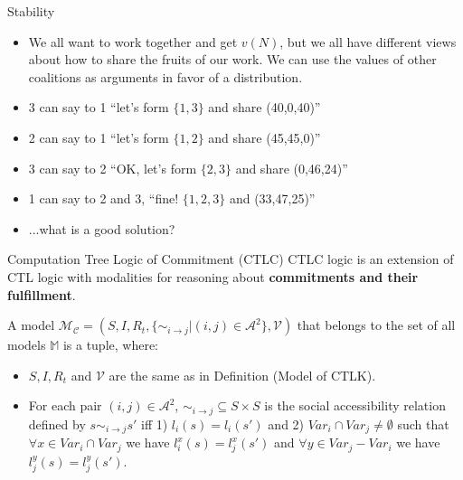 \documentclass{beamer}
\begin{document}
\begin{frame}{Stability}
    \begin{itemize}
        \item We all want to work together and get $v(N)$, but we all have different views about how to share the fruits of our work. We can use the values of other coalitions as arguments in favor of a distribution.
        \item 3 can say to 1 ``let's form $\{1,3\}$ and share (40,0,40)''
        \item 2 can say to 1 ``let's form $\{1,2\}$ and share (45,45,0)''
        \item 3 can say to 2 ``OK, let's form $\{2,3\}$ and share (0,46,24)''
        \item 1 can say to 2 and 3, ``fine! $\{1,2,3\}$ and (33,47,25)''
        \item ...what is a good solution?
    \end{itemize}
\end{frame}
\begin{frame}{Computation Tree Logic of Commitment (CTLC)}
CTLC logic is an extension of CTL logic with modalities for reasoning about \textbf{commitments and their fulfillment}.
\begin{definition} \label{Model of CTLC}
A model $\mathcal{M_C}=(S,I,R_t, \{\sim _{i \rightarrow j}|{(i,j)\in \mathcal{A}^2}\},\mathcal{V})$ that belongs to the set of all models $\mathbb{M}$ is a tuple, where:
\begin {itemize}
\item $S, I, R_t$ and $\mathcal{V}$ are the same as in Definition (Model of CTLK).
\item For each pair $(i, j) \in \mathcal{A}^2 $, $\sim _{i \rightarrow j} \subseteq S \times S $ is the social accessibility relation defined by $ s \sim _{i \rightarrow j} s' $ iff
     1) $ l_i(s) = l_i(s') $ and 2) $ Var_i \cap Var_j \neq \emptyset $ such that  $ \forall x \in Var_i \cap Var_j $ we have $ l_i^x(s) = l_j^x(s') $ and $ \forall y \in Var_j - Var_i $ we have $ l_j^y(s) = l_j^y(s')$.

\end {itemize}
\label {dfn: Model of CTLC}
\end{definition}
\end{frame}
\end{document}
